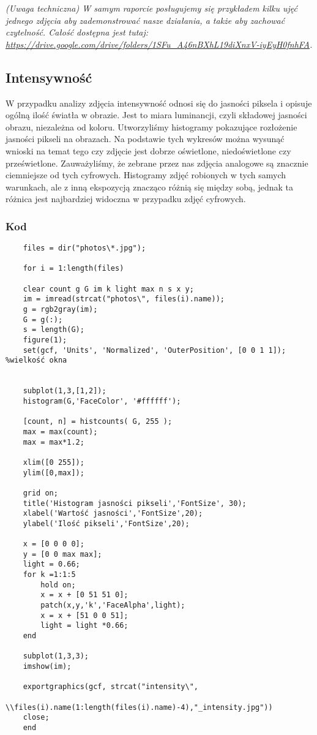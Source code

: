 \documentclass[]{mwart}
\begin{document}
\textit{(Uwaga techniczna) W samym raporcie posługujemy się przykładem
    kilku ujęć jednego zdjęcia aby zademonstrować nasze działania, a także
    aby zachować czytelność. Całość dostępna jest tutaj: \url{https://drive.google.com/drive/folders/1SFu_A46nBXhL19diXnxV-iyEyH0fnhFA}.}


\newpage
\subsection{Intensywność}
W przypadku analizy zdjęcia intensywność odnosi się do jasności piksela i
opisuje ogólną ilość światła w obrazie. Jest to miara luminancji, czyli składowej
jasności obrazu, niezależna od koloru. Utworzyliśmy histogramy pokazujące rozłożenie
jasności pikseli na obrazach. Na podstawie tych wykresów można wysunąć wnioski na
temat tego czy zdjęcie jest dobrze oświetlone, niedoświetlone czy prześwietlone.
Zauważyliśmy, że zebrane przez nas zdjęcia analogowe są znacznie ciemniejsze od
tych cyfrowych. Histogramy zdjęć robionych w tych samych warunkach, ale z inną
ekspozycją znacząco różnią się między sobą, jednak ta różnica jest najbardziej
widoczna w przypadku zdjęć cyfrowych.


\subsubsection{Kod}
\begin{verbatim}
    files = dir("photos\*.jpg");
    
    for i = 1:length(files)
    
    clear count g G im k light max n s x y;
    im = imread(strcat("photos\", files(i).name));
    g = rgb2gray(im);
    G = g(:);
    s = length(G);
    figure(1);
    set(gcf, 'Units', 'Normalized', 'OuterPosition', [0 0 1 1]); %wielkość okna
    
    
    subplot(1,3,[1,2]); 
    histogram(G,'FaceColor', '#ffffff');
    
    [count, n] = histcounts( G, 255 );
    max = max(count);
    max = max*1.2;
    
    xlim([0 255]);
    ylim([0,max]);
    
    grid on;
    title('Histogram jasności pikseli','FontSize', 30);
    xlabel('Wartość jasności','FontSize',20);
    ylabel('Ilość pikseli','FontSize',20);
    
    x = [0 0 0 0];
    y = [0 0 max max];
    light = 0.66;
    for k =1:1:5
        hold on;
        x = x + [0 51 51 0];
        patch(x,y,'k','FaceAlpha',light);
        x = x + [51 0 0 51];
        light = light *0.66;
    end
    
    subplot(1,3,3);
    imshow(im);
    
    exportgraphics(gcf, strcat("intensity\", 
                        \\files(i).name(1:length(files(i).name)-4),"_intensity.jpg"))
    close;
    end
    \end{verbatim}
\end{document}
